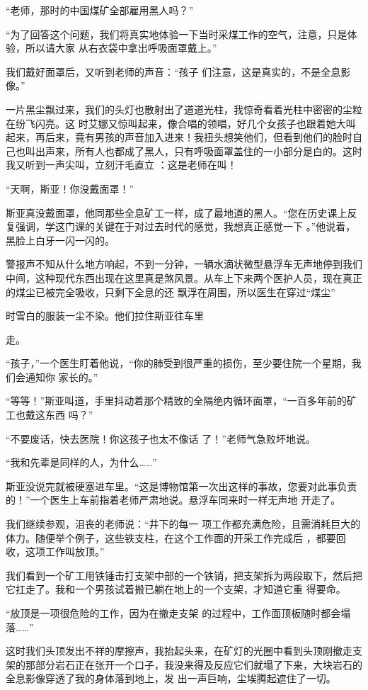 \documentclass{article}
\begin{document}
“老师，那时的中国煤矿全部雇用黑人吗？”

“为了回答这个问题，我们将真实地体验一下当时采煤工作的空气，注意，只是体验，所以请大家
从右衣袋中拿出呼吸面罩戴上。” 

我们戴好面罩后，又听到老师的声音：“孩子
们注意，这是真实的，不是全息影像。” 

一片黑尘飘过来，我们的头灯也散射出了道道光柱，我惊奇看着光柱中密密的尘粒在纷飞闪亮。这
\newpage
时艾娜又惊叫起来，像合唱的领唱，好几个女孩子也跟着她大叫起来，再后来，竟有男孩的声音加入进来！我扭头想笑他们，但看到他们的脸时自己也叫出声来，所有人也都成了黑人，只有呼吸面罩盖住的一小部分是白的。这时我又听到一声尖叫，立刻汗毛直立
：这是老师在叫！ 


“天啊，斯亚！你没戴面罩！” 

斯亚真没戴面罩，他同那些全息矿工一样，成了最地道的黑人。“您在历史课上反复强调，学这门课的关键在于对过去时代的感觉，我想真正感觉一下
。”他说着，黑脸上白牙一闪一闪的。 

警报声不知从什么地方响起，不到一分钟，一辆水滴状微型悬浮车无声地停到我们中间，这种现代东西出现在这里真是煞风景。从车上下来两个医护人员，现在真正的煤尘已被完全吸收，只剩下全息的还
飘浮在周围，所以医生在穿过“煤尘” 

时雪白的服装一尘不染。他们拉住斯亚往车里
\newpage

走。 

“孩子，”一个医生盯着他说，“你的肺受到很严重的损伤，至少要住院一个星期，我们会通知你
家长的。” 

“等等！”斯亚叫道，手里抖动着那个精致的全隔绝内循环面罩，“一百多年前的矿工也戴这东西
吗？” 

“不要废话，快去医院！你这孩子也太不像话
了！”老师气急败坏地说。 


“我和先辈是同样的人，为什么……” 

斯亚没说完就被硬塞进车里。“这是博物馆第一次出这样的事故，您要对此事负责的！”一个医生上车前指着老师严肃地说。悬浮车同来时一样无声地
开走了。 

我们继续参观，沮丧的老师说：“井下的每一
\newpage
项工作都充满危险，且需消耗巨大的体力。随便举个例子，这些铁支柱，在这个工作面的开采工作完成后
，都要回收，这项工作叫放顶。” 

我们看到一个矿工用铁锤击打支架中部的一个铁销，把支架拆为两段取下，然后把它扛走了。我和一个男孩试着搬已躺在地上的一个支架，才知道它重
得要命。 

“放顶是一项很危险的工作，因为在撤走支架
的过程中，工作面顶板随时都会塌落……” 

这时我们头顶发出不祥的摩擦声，我抬起头来，在矿灯的光圈中看到头顶刚撤走支架的那部分岩石正在张开一个口子，我没来得及反应它们就塌了下来，大块岩石的全息影像穿透了我的身体落到地上，发
出一声巨响，尘埃腾起遮住了一切。 
\end{document}

